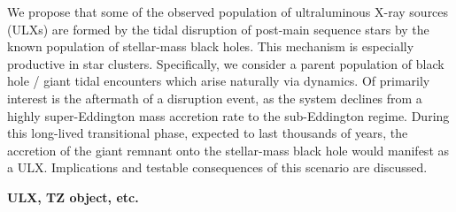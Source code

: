 We propose that some of the observed population of ultraluminous X-ray sources (ULXs) are formed by the tidal 
disruption of post-main sequence stars by the known population of stellar-mass black holes.  This mechanism is especially productive in star clusters.  Specifically, we consider a parent population of black hole / giant tidal encounters which arise naturally via dynamics.  Of primarily interest is the aftermath of a disruption event, as the system declines from a highly super-Eddington mass accretion rate to the sub-Eddington regime.  During this long-lived transitional phase, expected to last thousands of years, the accretion of the giant remnant onto the stellar-mass black hole would manifest as a ULX.   Implications and testable consequences of this scenario are discussed.



{\bf ULX, TZ object, etc.}

